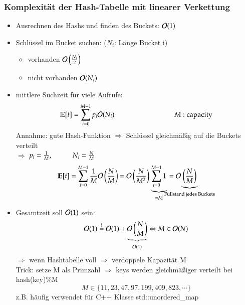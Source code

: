 \subsubsection*{Komplexität der Hash-Tabelle mit linearer Verkettung}
\begin{itemize}
    \item Ausrechnen des Hashs und finden des Buckets: $\mathcal{O}{}(1)$
    \item Schlüssel im Bucket suchen: ($N_i$: Länge Bucket i)
    \begin{itemize}
        \item vorhanden $\mathcal{O}{}\left(\frac{N_i}{2}\right)$
        \item nicht vorhanden $\mathcal{O}{}(N_i)$
    \end{itemize}
    \item mittlere Suchzeit für viele Aufrufe:
    \[ \mathbb{E}[t] = \sum_{i=0}^{M-1} p_i\bigO{}(N_i) \hspace*{3cm} M : \text{capacity} \]
    Annahme: gute Hash-Funktion $\Rightarrow$ Schlüssel gleichmäßig auf die Buckets verteilt\\ $\Rightarrow$ $p_i = \frac{1}{M}, \hspace*{1cm} N_i = \frac{N}{M}$
    \[ \mathbb{E}[t] = \sum_{i=0}^{M-1} \frac{1}{M} \bigO{} \left(\frac{N}{M}\right) = \bigO{} \left(\frac{N}{M^2}\right) \underbrace{\sum_{i=0}^{M-1} 1}_{=M} = \bigO{} \hspace*{-9mm} \underbrace{\left(\frac{N}{M}\right)}_{\text{Füllstand jedes Buckets}}\]
    \item Gesamtzeit soll $\mathcal{O}{}(1)$ sein:
    \[ \mathcal{O}{}(1)  \stackrel{!}{=} \mathcal{O}{}(1) + \underbrace{\mathcal{O}{}\left(\frac{N}{M}\right)}_{\mathcal{O}{}(1)} \Leftrightarrow M \in \mathcal{O}{}(N)\]
$\Rightarrow$ wenn Hashtabelle voll $\Rightarrow$ verdoppele Kapazität M \\
Trick: setze M als Primzahl $\Rightarrow$ keys werden gleichmäßiger verteilt bei hash(key)\%M
\[ M \in \{11, 23, 47, 97, 199, 409, 823, \cdots\}\]
z.B. häufig verwendet für C++ Klasse std::unordered\_map
\end{itemize}

